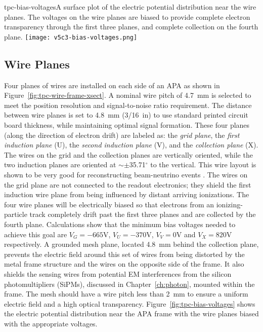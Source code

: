 \begin{cdrfigure}{tpc-bias-voltages}{A surface plot of the electric potential distribution near the wire planes.  The voltages on the wire planes are biased to provide complete electron transparency through the first three planes, and complete collection on the fourth plane.}
\texttt{[image: v5c3-bias-voltages.png]}
\end{cdrfigure}


\subsection{Wire Planes}


Four planes of wires are installed on each side of an APA as shown in Figure~\ref{fig:tpc-wire-frame-xsect}.
A nominal wire pitch of 4.7~mm is selected to meet the position resolution  and signal-to-noise ratio requirement. The distance between wire planes is set to 4.8~mm (3/16~in) to use standard printed circuit board thickness, while maintaining optimal signal formation.  These four planes (along the direction of electron drift) are labeled as: the {\em grid plane}, the {\em first induction plane} (U), the {\em second induction plane} (V), and the {\em collection plane} (X).
The wires on the grid and the collection planes
are vertically oriented, while the two induction planes are oriented 
at $\sim\pm$35.71$^\circ$ to the vertical. This wire layout is shown to be very good for reconstructing beam-neutrino events \cite{wire-orientation}. The wires on the grid plane are not 
connected to the readout electronics; they shield the first induction wire plane from being influenced by distant arriving ionizations. The four wire planes 
will be electrically biased so that electrons from an ionizing-particle
track completely drift past the first three planes and are collected by the 
fourth plane. Calculations show that the minimum bias voltages 
needed to achieve this goal are $V_G= -665$V, $V_U=-370$V, $V_V=0$V and $V_X=820$V 
respectively.  A grounded mesh plane, located 4.8~mm behind the collection plane, prevents the electric field around this set of wires from being distorted by the metal frame structure and the wires on the opposite side of the frame. It also shields the sensing wires from potential EM interferences from the silicon photomultipliers (SiPMs), discussed in Chapter~\ref{ch:photon}, mounted within the frame.  The mesh should have a wire pitch less than 2~mm to ensure a uniform electric field and a high optical transparency.  Figure~\ref{fig:tpc-bias-voltages} shows the electric potential distribution near the APA frame with the wire planes biased with the appropriate voltages. 


